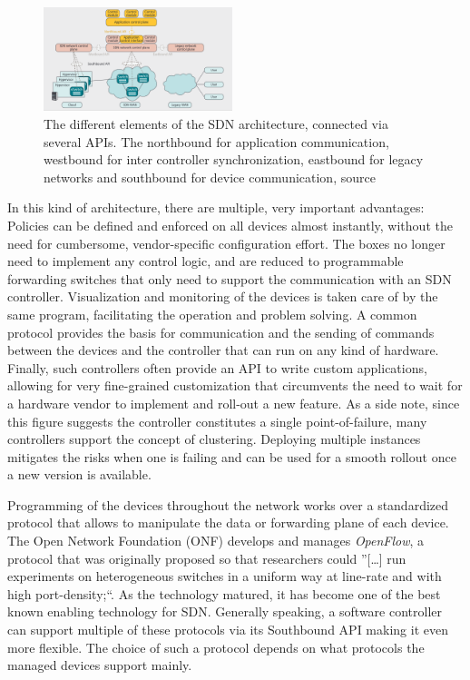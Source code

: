 \begin{figure}[h]
	\centering
	\includegraphics[width=0.49\textwidth]{images/sdnAPIs.png}
	\caption{The different elements of the SDN architecture, connected via several APIs. The northbound for application communication, westbound for inter controller synchronization, eastbound for legacy networks and southbound for device communication, source \cite{jarschel2014interfaces}}
	\label{img:sdnAPIs}
\end{figure}

In this kind of architecture, there are multiple, very important advantages: Policies can be defined and enforced on all devices almost instantly, without the need for cumbersome, vendor-specific configuration effort. The boxes no longer need to implement any control logic, and are reduced to programmable forwarding switches that only need to support the communication with an SDN controller. Visualization and monitoring of the devices is taken care of by the same program, facilitating the operation and problem solving. A common protocol provides the basis for communication and the sending of commands between the devices and the controller that can run on any kind of hardware. Finally, such controllers often provide an API to write custom applications, allowing for very fine-grained customization that circumvents the need to wait for a hardware vendor to implement and roll-out a new feature. As a side note, since this figure suggests the controller constitutes a single point-of-failure, many controllers support the concept of clustering. Deploying multiple instances mitigates the risks when one is failing and can be used for a smooth rollout once a new version is available.  

Programming of the devices throughout the network works over a standardized protocol that allows to manipulate the data or forwarding plane of each device. The Open Network Foundation (ONF) develops and manages \textit{OpenFlow}, a protocol that was originally proposed so that researchers could ''[\dots] run experiments on heterogeneous switches in a uniform way at line-rate and with high port-density;``\cite{mckeown2008openflow}. As the technology matured, it has become one of the best known enabling technology for SDN. Generally speaking, a software controller can support multiple of these protocols via its Southbound API making it even more flexible. The choice of such a protocol depends on what protocols the managed devices support mainly. 

